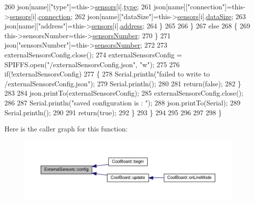 \begin{DoxyCode}
260                     json[name][\textcolor{stringliteral}{"type"}]=this->\hyperlink{classExternalSensors_a284233f884fcf00154a44740cf1d9e1e}{sensors}[i].\hyperlink{structExternalSensors_1_1sensor_a6acfdb02c742c2110d7bd2b5d9fce9e7}{type};
261                     json[name][\textcolor{stringliteral}{"connection"}]=this->\hyperlink{classExternalSensors_a284233f884fcf00154a44740cf1d9e1e}{sensors}[i].\hyperlink{structExternalSensors_1_1sensor_ae3c8c1da809f2238bc9abde37a6c6022}{connection};
262                     json[name][\textcolor{stringliteral}{"dataSize"}]=this->\hyperlink{classExternalSensors_a284233f884fcf00154a44740cf1d9e1e}{sensors}[i].\hyperlink{structExternalSensors_1_1sensor_ae9c669bb93befbe4b333920e7f357b80}{dataSize};
263                     json[name][\textcolor{stringliteral}{"address"}]=this->\hyperlink{classExternalSensors_a284233f884fcf00154a44740cf1d9e1e}{sensors}[i].\hyperlink{structExternalSensors_1_1sensor_a8d70ca58524521ed054fc6b81eb58d34}{address};
264                 \}
265  
266             \}
267             \textcolor{keywordflow}{else}
268             \{
269                 this->sensorsNumber=this->\hyperlink{classExternalSensors_a58e4fbf9adeae787d92be5fa33043b5d}{sensorsNumber};
270             \}
271             json[\textcolor{stringliteral}{"sensorsNumber"}]=this->\hyperlink{classExternalSensors_a58e4fbf9adeae787d92be5fa33043b5d}{sensorsNumber};
272 
273             externalSensorsConfig.close();
274             externalSensorsConfig = SPIFFS.open(\textcolor{stringliteral}{"/externalSensorsConfig.json"}, \textcolor{stringliteral}{"w"});
275 
276             \textcolor{keywordflow}{if}(!externalSensorsConfig)
277             \{
278                 Serial.println(\textcolor{stringliteral}{"failed to write to /externalSensorsConfig.json"});
279                 Serial.println();
280 
281                 \textcolor{keywordflow}{return}(\textcolor{keyword}{false});
282             \}
283             
284             json.printTo(externalSensorsConfig);
285             externalSensorsConfig.close();
286             
287             Serial.println(\textcolor{stringliteral}{"saved configuration is : "});
288             json.printTo(Serial);
289             Serial.println();
290 
291             \textcolor{keywordflow}{return}(\textcolor{keyword}{true}); 
292         \}
293     \}   
294     
295 
296 
297 
298 \}
\end{DoxyCode}
Here is the caller graph for this function\+:\nopagebreak
\begin{figure}[H]
\begin{center}
\leavevmode
\includegraphics[width=350pt]{classExternalSensors_a862a4bd11346b37270d0244c2adabe5a_icgraph}
\end{center}
\end{figure}
